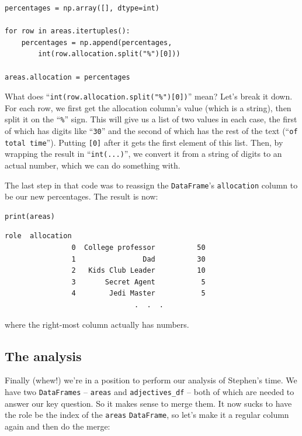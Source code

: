 \begin{Verbatim}[fontsize=\footnotesize,samepage=true,frame=single,framesep=3mm]
percentages = np.array([], dtype=int)

for row in areas.itertuples():
    percentages = np.append(percentages,
        int(row.allocation.split("%")[0]))

areas.allocation = percentages
\end{Verbatim}

What does ``\texttt{int(row.allocation.split("\%")[0])}'' mean? Let's break it
down. For each row, we first get the allocation column's value (which is a
string), then split it on the ``\texttt{\%}'' sign. This will give us a list of
two values in each case, the first of which has digits like ``\texttt{30}'' and
the second of which has the rest of the text (``\texttt{of total time}'').
Putting \texttt{[0]} after it gets the first element of this list. Then, by
wrapping the result in ``\texttt{int(...)}'', we convert it from a string of
digits to an actual number, which we can do something with.

\smallskip
The last step in that code was to reassign the \texttt{DataFrame}'s
\texttt{allocation} column to be our new percentages. The result is now:

\begin{Verbatim}[fontsize=\small,samepage=true,frame=single,framesep=3mm]
print(areas)
\end{Verbatim}

\begin{Verbatim}[fontsize=\small,samepage=true,frame=leftline,framesep=5mm,framerule=1mm]
                                role  allocation
                0  College professor          50
                1                Dad          30
                2   Kids Club Leader          10
                3       Secret Agent           5
                4        Jedi Master           5
                               .  .  .
\end{Verbatim}

where the right-most column actually has numbers.

\subsection{The analysis}


Finally (whew!) we're in a position to perform our analysis of Stephen's time.
We have two \texttt{DataFrames} -- \texttt{areas} and \texttt{adjectives\_df}
-- both of which are needed to answer our key question. So it makes sense to
merge them. It now sucks to have the role be the index of the \texttt{areas}
\texttt{DataFrame}, so let's make it a regular column again and then do the
merge:

